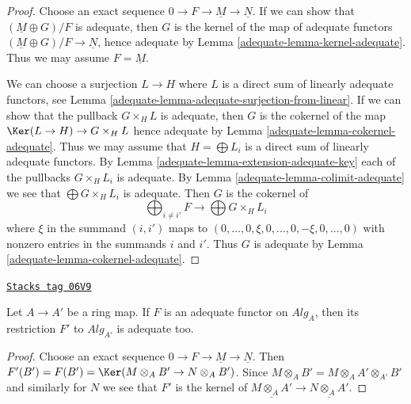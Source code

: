 \begin{proof}

Choose an exact sequence $0 \to F \to \underline{M} \to \underline{N}$.
If we can show that $(\underline{M} \oplus G)/F$ is adequate, then
$G$ is the kernel of the map of adequate functors
$(\underline{M} \oplus G)/F \to \underline{N}$, hence
adequate by
Lemma \ref{adequate-lemma-kernel-adequate}.
Thus we may assume $F = \underline{M}$.

\medskip\noindent
We can choose a surjection $L \to H$ where $L$ is a direct sum of
linearly adequate functors, see
Lemma \ref{adequate-lemma-adequate-surjection-from-linear}.
If we can show that the pullback $G \times_H L$ is adequate, then
$G$ is the cokernel of the map $\Ker(L \to H) \to G \times_H L$
hence adequate by
Lemma \ref{adequate-lemma-cokernel-adequate}.
Thus we may assume that $H = \bigoplus L_i$ is a direct sum of
linearly adequate functors. By
Lemma \ref{adequate-lemma-extension-adequate-key}
each of the pullbacks $G \times_H L_i$ is adequate. By
Lemma \ref{adequate-lemma-colimit-adequate}
we see that $\bigoplus G \times_H L_i$ is adequate.
Then $G$ is the cokernel of
$$
\bigoplus\nolimits_{i \not = i'} F \longrightarrow
\bigoplus G \times_H L_i
$$
where $\xi$ in the summand $(i, i')$ maps to
$(0, \ldots, 0, \xi, 0, \ldots, 0, -\xi, 0, \ldots, 0)$
with nonzero entries in the summands $i$ and $i'$.
Thus $G$ is adequate by
Lemma \ref{adequate-lemma-cokernel-adequate}.
\end{proof}

\begin{lemma}
\label{adequate-lemma-base-change-adequate}
\href{https://stacks.math.columbia.edu/tag/06V9}{\texttt{Stacks tag 06V9}}

Let $A \to A'$ be a ring map. If $F$ is an adequate functor on
$\textit{Alg}_A$, then its restriction $F'$ to
$\textit{Alg}_{A'}$ is adequate too.
\end{lemma}

\begin{proof}
Choose an exact sequence $0 \to F \to \underline{M} \to \underline{N}$.
Then $F'(B') = F(B') = \Ker(M \otimes_A B' \to N \otimes_A B')$.
Since $M \otimes_A B' = M \otimes_A A' \otimes_{A'} B'$ and similarly
for $N$ we see that $F'$ is the kernel of
$\underline{M \otimes_A A'} \to \underline{N \otimes_A A'}$.
\end{proof}


